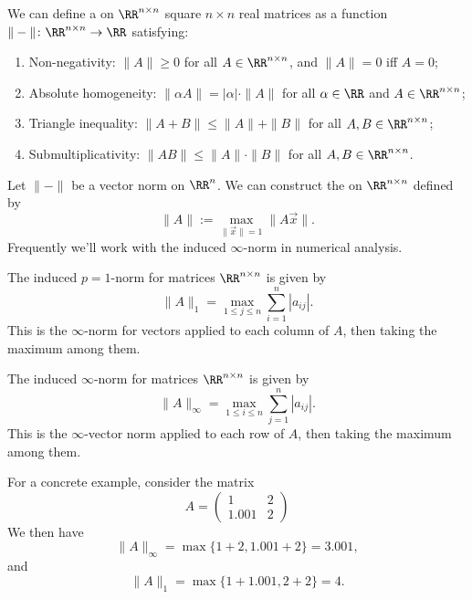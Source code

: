 \begin{definition}
We can define a  on $\RR^{n\times n}$ square
$n\times n$ real matrices as a function $\|-\|\colon\RR^{n\times n}\to\RR$
satisfying:
\begin{enumerate}
\item Non-negativity: $\|A\|\geq0$ for all $A\in\RR^{n\times n}$, and
  $\|A\|=0$ iff $A=0$;
\item Absolute homogeneity: $\|\alpha A\|=|\alpha|\cdot\|A\|$ for all
  $\alpha\in\RR$ and $A\in\RR^{n\times n}$;
\item Triangle inequality: $\|A+B\|\leq\|A\|+\|B\|$ for all $A,B\in\RR^{n\times n}$;
\item Submultiplicativity: $\|AB\|\leq\|A\|\cdot\|B\|$ for all $A,B\in\RR^{n\times n}$.
\end{enumerate}
\end{definition}

\begin{example}
Let $\|-\|$ be a vector norm on $\RR^{n}$. We can construct the
 on $\RR^{n\times n}$ defined by
\begin{equation}
\|A\| := \max_{\|\vec{x}\|=1}\|A\vec{x}\|.
\end{equation}
Frequently we'll work with the induced $\infty$-norm in numerical analysis.
\end{example}

\begin{example}
The induced $p=1$-norm for matrices $\RR^{n\times n}$ is given by
\begin{equation}
\|A\|_{1}=\max_{1\leq j\leq n}\sum^{n}_{i=1}|a_{ij}|.
\end{equation}
This is the $\infty$-norm for vectors applied to each column of $A$, then
taking the maximum among them.
\end{example}

\begin{example}
The induced $\infty$-norm for matrices $\RR^{n\times n}$ is given by
\begin{equation}
\|A\|_{\infty}=\max_{1\leq i\leq n}\sum^{n}_{j=1}|a_{ij}|.
\end{equation}
This is the $\infty$-vector norm applied to each row of $A$, then
taking the maximum among them.
\end{example}

\begin{example}
For a concrete example, consider the matrix
\begin{equation}
  A = \begin{pmatrix}1 & 2\\
    1.001 & 2
  \end{pmatrix}
\end{equation}
We then have
\begin{equation}
\|A\|_{\infty}=\max\{1+2, 1.001+2\}=3.001,
\end{equation}
and
\begin{equation}
\|A\|_{1}=\max\{1+1.001,2+2\}=4.
\end{equation}
\end{example}

